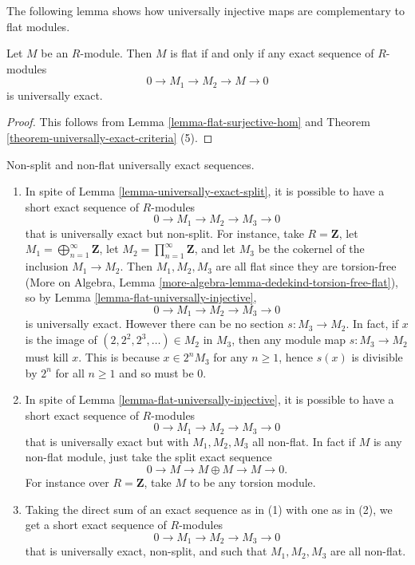 \noindent
The following lemma shows how universally injective maps are complementary to
flat modules.

\begin{lemma}
\label{lemma-flat-universally-injective}
Let $M$ be an $R$-module.  Then $M$ is flat if and only if any exact sequence
of $R$-modules
$$
0 \to M_1 \to M_2 \to M \to 0
$$
is universally exact.
\end{lemma}

\begin{proof}
This follows from Lemma \ref{lemma-flat-surjective-hom} and
Theorem \ref{theorem-universally-exact-criteria} (5).
\end{proof}

\begin{example}
\label{example-universally-exact-non-split-non-flat}
Non-split and non-flat universally exact sequences.
\begin{enumerate}
\item In spite of
Lemma \ref{lemma-universally-exact-split},
it is possible to  have a short exact sequence of $R$-modules
$$
0 \to M_1 \to M_2 \to M_3 \to 0
$$
that is universally exact but non-split.  For instance, take $R = \mathbf{Z}$,
let $M_1 = \bigoplus_{n=1}^{\infty} \mathbf{Z}$, let $M_{2} = \prod_{n =
1}^{\infty} \mathbf{Z}$, and let $M_{3}$ be the cokernel of the inclusion $M_1
\to M_2$.  Then $M_1, M_2, M_3$ are all flat since they are torsion-free
(More on Algebra, Lemma \ref{more-algebra-lemma-dedekind-torsion-free-flat}),
so by Lemma \ref{lemma-flat-universally-injective},
$$
0 \to M_1 \to M_2 \to M_3 \to 0
$$
is universally exact.  However there can be no section $s: M_3 \to
M_2$.  In fact, if $x$ is the image of $(2, 2^2, 2^3, \ldots) \in M_2$ in $M_3$,
then any module map $s: M_3 \to M_2$ must kill $x$.  This is because $x
\in 2^n M_3$ for any $n \geq 1$, hence $s(x)$ is divisible by $2^n$ for all $n
\geq 1$ and so must be $0$.
\item In spite of Lemma \ref{lemma-flat-universally-injective}, it is possible
to have a short exact sequence of $R$-modules
$$
0 \to M_1 \to M_2 \to M_3 \to 0
$$
that is universally exact but with $M_1, M_2, M_3$ all non-flat.  In fact if $M$
is any non-flat module, just take the split exact sequence
$$
0 \to M \to M \oplus M \to M \to 0.
$$
For instance over $R = \mathbf{Z}$, take $M$ to be any torsion module.
\item Taking the direct sum of an exact sequence as in (1) with one as in (2),
we get a short exact sequence of $R$-modules
$$
0 \to M_1 \to M_2 \to M_3 \to 0
$$
that is universally exact, non-split, and such that
$M_1, M_2, M_3$ are all non-flat.
\end{enumerate}
\end{example}

